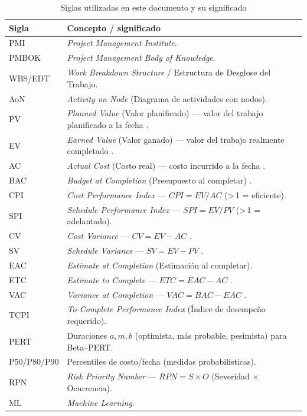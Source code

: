 \documentclass[12pt]
{charter}
\begin{document}
\begin{table}[h]
\centering
\caption{Siglas utilizadas en este documento y su significado}
\begin{tabularx}{\textwidth}{lY}
\toprule
\textbf{Sigla} & \textbf{Concepto / significado} \\
\midrule
PMI & \textit{Project Management Institute}. \\
PMBOK & \textit{Project Management Body of Knowledge}. \\
WBS/EDT & \textit{Work Breakdown Structure} / Estructura de Desglose del Trabajo. \\
AoN & \textit{Activity on Node} (Diagrama de actividades con nodos). \\
PV & \textit{Planned Value} (Valor planificado) — valor del trabajo planificado a la fecha \;[\$]. \\
EV & \textit{Earned Value} (Valor ganado) — valor del trabajo realmente completado \;[\$]. \\
AC & \textit{Actual Cost} (Costo real) — costo incurrido a la fecha \;[\$]. \\
BAC & \textit{Budget at Completion} (Presupuesto al completar) \;[\$]. \\
CPI & \textit{Cost Performance Index} — $CPI = EV/AC$ (>\,1 = eficiente). \\
SPI & \textit{Schedule Performance Index} — $SPI = EV/PV$ (>\,1 = adelantado). \\
CV & \textit{Cost Variance} — $CV = EV - AC$ \;[\$]. \\
SV & \textit{Schedule Variance} — $SV = EV - PV$ \;[\$]. \\
EAC & \textit{Estimate at Completion} (Estimación al completar). \\
ETC & \textit{Estimate to Complete} — $ETC = EAC - AC$ \;[\$]. \\
VAC & \textit{Variance at Completion} — $VAC = BAC - EAC$ \;[\$]. \\
TCPI & \textit{To-Complete Performance Index} (Índice de desempeño requerido). \\
PERT & Duraciones $a,m,b$ (optimista, más probable, pesimista) para Beta–PERT. \\
P50/P80/P90 & Percentiles de costo/fecha (medidas probabilísticas). \\
RPN & \textit{Risk Priority Number} — $RPN = S \times O$ (Severidad $\times$ Ocurrencia). \\
ML & \textit{Machine Learning}. \\
\bottomrule
\end{tabularx}
\end{table}
\end{document}
